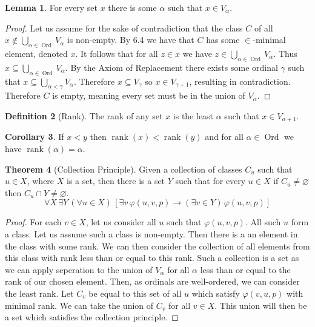 \documentclass{article}
\theoremstyle{definition}
\newtheorem{thm}{Theorem}[section]
\newtheorem{crly}[thm]{Corollary}
\newtheorem{defn}[thm]{Definition}
\newtheorem{lmma}[thm]{Lemma}
\newcommand*{\mtset}{\ensuremath{\varnothing}}
\DeclareMathOperator{\rank}{rank}
\DeclareMathOperator{\Ord}{Ord}
\begin{document}
\begin{lmma}
    For every set $x$ there is some $\alpha$ such that $x \in V_\alpha$.
\end{lmma}

\begin{proof}
    Let us assume for the sake of contradiction that the class $C$ of all $x \not \in \bigcup_{\alpha \in \Ord} V_\alpha$ is non-empty. By 6.4 we have that $C$ has some $\in$-minimal element, denoted $x$. It follows that for all $z \in x$ we have $z \in \bigcup_{\alpha \in \Ord} V_\alpha$. Thus $x \subseteq \bigcup_{\alpha \in \Ord} V_\alpha$. By the Axiom of Replacement there exists some ordinal $\gamma$ such that $x \subseteq \bigcup_{\alpha < \gamma} V_\alpha$. Therefore $x \subseteq V_\gamma$ so $x \in V_{\gamma + 1}$, resulting in contradiction. Therefore $C$ is empty, meaning every set must be in the union of $V_\alpha$.
\end{proof}

\begin{defn}[Rank]
    The rank of any set $x$ is the least $\alpha$ such that $x \in V_{\alpha + 1}$.
\end{defn}

\begin{crly}
    If $x < y$ then $\rank(x) < \rank(y)$ and for all $\alpha \in \Ord$ we have $\rank(\alpha) = \alpha$.
\end{crly}

\begin{thm}[Collection Principle]
    Given a collection of classes $C_u$ such that $u \in X$, where $X$ is a set, then there is a set $Y$ such that for every $u \in X$ if $C_u \ne \mtset$ then $C_u \cap Y \ne \mtset$. 
    \[
        \forall X \, \exists Y \, (\forall u \in X) \, [\exists v \, \varphi(u, v, p) \to (\exists v \in Y) \, \varphi(u, v, p)]
    \]
\end{thm}

\begin{proof}   
    For each $v \in X$, let us consider all $u$ such that $\varphi(u, v, p)$. All such $u$ form a class. Let us assume such a class is non-empty. Then there is a an element in the class with some rank. We can then consider the collection of all elements from this class with rank less than or equal to this rank. Such a collection is a set as we can apply seperation to the union of $V_\alpha$ for all $\alpha$ less than or equal to the rank of our chosen element. Then, as ordinals are well-ordered, we can consider the least rank. Let $C_v$ be equal to this set of all $u$ which satisfy $\varphi(v, u, p)$ with minimal rank. We can take the union of $C_v$ for all $v \in X$. This union will then be a set which satisfies the collection principle.
\end{proof}
\end{document}
